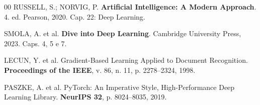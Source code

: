 \documentclass[
	12pt,
	a4paper,
	article,
	twocolumn
]{abntex2}
\begin{document}
\begin{thebibliography}{00}
\footnotesize
\setlength{\itemsep}{0pt}
\setlength{\parskip}{0pt}
RUSSELL, S.; NORVIG, P. \textbf{Artificial Intelligence: A Modern Approach}. 4. ed. Pearson, 2020. Cap. 22: Deep Learning.

SMOLA, A. et al. \textbf{Dive into Deep Learning}. Cambridge University Press, 2023. Caps. 4, 5 e 7.

LECUN, Y. et al. Gradient-Based Learning Applied to Document Recognition. \textbf{Proceedings of the IEEE}, v. 86, n. 11, p. 2278--2324, 1998.

PASZKE, A. et al. PyTorch: An Imperative Style, High-Performance Deep Learning Library. \textbf{NeurIPS 32}, p. 8024--8035, 2019.
\end{thebibliography}
\end{document}
